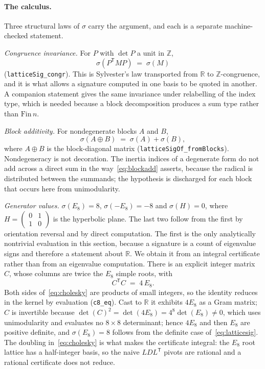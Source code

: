 \paragraph{The calculus.}
Three structural laws of $\sigma$ carry the argument, and each is a
separate machine-checked statement.

\emph{Congruence invariance.} For $P$ with $\det P$ a unit in
$\mathbb{Z}$,
\begin{equation}
\sigma\!\left(P^{\mathsf T} M P\right) \;=\; \sigma(M)
\label{eq:sylvester}
\end{equation}
(\texttt{latticeSig\_congr}). This is Sylvester's law transported from
$\mathbb{R}$ to $\mathbb{Z}$-congruence, and it is what allows a
signature computed in one basis to be quoted in another. A companion
statement gives the same invariance under relabelling of the index type,
which is needed because a block decomposition produces a sum type rather
than $\mathrm{Fin}\,n$.

\emph{Block additivity.} For nondegenerate blocks $A$ and $B$,
\begin{equation}
\sigma(A \oplus B) \;=\; \sigma(A) + \sigma(B),
\label{eq:blockadd}
\end{equation}
where $A\oplus B$ is the block-diagonal matrix
(\texttt{latticeSigOf\_fromBlocks}). Nondegeneracy is not decoration.
The inertia indices of a degenerate form do not add across a direct sum
in the way~\eqref{eq:blockadd} asserts, because the radical is
distributed between the summands; the hypothesis is discharged for each
block that occurs here from unimodularity.

\emph{Generator values.} $\sigma(E_8) = 8$, $\sigma(-E_8) = -8$ and
$\sigma(H) = 0$, where $H = \left(\begin{smallmatrix} 0 & 1 \\ 1 & 0
\end{smallmatrix}\right)$ is the hyperbolic plane. The last two follow
from the first by orientation reversal and by direct computation. The
first is the only analytically nontrivial evaluation in this section,
because a signature is a count of eigenvalue signs and therefore a
statement about $\mathbb{R}$. We obtain it from an integral certificate
rather than from an eigenvalue computation. There is an explicit integer
matrix $C$, whose columns are twice the $E_8$ simple roots, with
\begin{equation}
C^{\mathsf T} C \;=\; 4\,E_8 .
\label{eq:cholesky}
\end{equation}
Both sides of~\eqref{eq:cholesky} are products of small integers, so the
identity reduces in the kernel by evaluation (\texttt{c8\_eq}). Cast to
$\mathbb{R}$ it exhibits $4E_8$ as a Gram matrix; $C$ is invertible
because $\det(C)^2 = \det(4E_8) = 4^8\det(E_8) \neq 0$, which uses
unimodularity and evaluates no $8\times 8$ determinant; hence $4E_8$ and
then $E_8$ are positive definite, and $\sigma(E_8) = 8$ follows from the
definite case of~\eqref{eq:latticesig}. The doubling in~\eqref{eq:cholesky}
is what makes the certificate integral: the $E_8$ root lattice has a
half-integer basis, so the naive $LDL^{\mathsf T}$ pivots are rational and
a rational certificate does not reduce.

